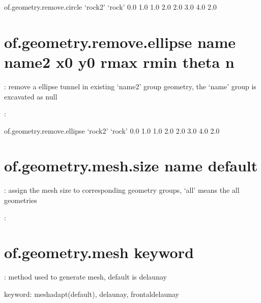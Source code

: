 \documentclass[letterpaper,10pt,english]{sphinxmanual}
\begin{document}
\begin{sphinxVerbatim}[commandchars=\\\{\}]
of.geometry.remove.circle ‘rock2’ ‘rock’ 0.0 1.0 1.0 2.0 2.0 3.0 4.0 2.0
\end{sphinxVerbatim}


\section{of.geometry.remove.ellipse name name2 x0 y0 rmax rmin theta n}
\label{\detokenize{rst_tutorials/command_line_guide:of-geometry-remove-ellipse-name-name2-x0-y0-rmax-rmin-theta-n}}
: remove a ellipse tunnel in existing ‘name2’ group geometry, the
‘name’ group is excavated as null

:

\begin{sphinxVerbatim}[commandchars=\\\{\}]
of.geometry.remove.ellipse ‘rock2’ ‘rock’ 0.0 1.0 1.0 2.0 2.0 3.0 4.0 2.0
\end{sphinxVerbatim}


\section{of.geometry.mesh.size name default}
\label{\detokenize{rst_tutorials/command_line_guide:of-geometry-mesh-size-name-default}}
: assign the mesh size to corresponding geometry groups, ‘all’
means the all geometries

:

\begin{sphinxVerbatim}[commandchars=\\\{\}]
  
\end{sphinxVerbatim}


\section{of.geometry.mesh keyword}
\label{\detokenize{rst_tutorials/command_line_guide:of-geometry-mesh-keyword}}
: method used to generate mesh, default is delaunay

keyword: meshadapt(default), delaunay, frontal\sphinxhyphen{}delaunay
\end{document}
